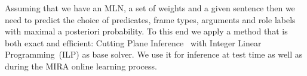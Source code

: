 



Assuming that we have an MLN, a set of weights and a given sentence then we need to predict the choice of predicates, frame types, arguments and role labels with maximal a posteriori probability. To this end we apply a method that is both exact and efficient: Cutting Plane Inference~\cite[CPI,][]{riedel08improving} with Integer Linear Programming~(ILP) as base solver. We use it for inference at test time as well as during the MIRA online learning process.


